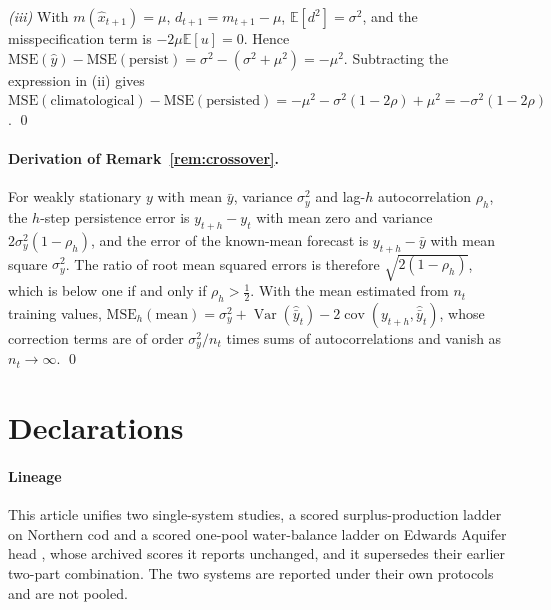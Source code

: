 \documentclass[preprint,11pt,authoryear]{elsarticle}
\theoremstyle{definition}
\theoremstyle{remark}
\newcommand{\MSE}{\mathrm{MSE}}
\newcommand{\pers}{\mathrm{persist}}
\newcommand{\E}{\mathbb{E}}
\begin{document}
\emph{(iii)} With $m(\hat x_{t+1})=\mu$, $d_{t+1}=m_{t+1}-\mu$, $\E[d^2]=\sigma^2$, and the misspecification term is $-2\mu\E[u]=0$. Hence $\MSE(\hat y)-\MSE(\pers) = \sigma^2-(\sigma^2+\mu^2) = -\mu^2$. Subtracting the expression in (ii) gives $\MSE(\text{climatological})-\MSE(\text{persisted}) = -\mu^2 - \sigma^2(1-2\rho)+\mu^2 = -\sigma^2(1-2\rho)$. \qed

\paragraph{Derivation of Remark~\ref{rem:crossover}.} For weakly stationary $y$ with mean $\bar y$, variance $\sigma_y^2$ and lag-$h$ autocorrelation $\rho_h$, the $h$-step persistence error is $y_{t+h}-y_t$ with mean zero and variance $2\sigma_y^2(1-\rho_h)$, and the error of the known-mean forecast is $y_{t+h}-\bar y$ with mean square $\sigma_y^2$. The ratio of root mean squared errors is therefore $\sqrt{2(1-\rho_h)}$, which is below one if and only if $\rho_h>\tfrac12$. With the mean estimated from $n_t$ training values, $\MSE_h(\mathrm{mean}) = \sigma_y^2 + \operatorname{Var}(\hat{\bar y}_t) - 2\operatorname{cov}(y_{t+h},\hat{\bar y}_t)$, whose correction terms are of order $\sigma_y^2/n_t$ times sums of autocorrelations and vanish as $n_t\to\infty$. \qed

\section*{Declarations}

\paragraph{Lineage} This article unifies two single-system studies, a scored surplus-production ladder on Northern cod \citep{Abaee2026cod} and a scored one-pool water-balance ladder on Edwards Aquifer head \citep{Abaee2026edwards}, whose archived scores it reports unchanged, and it supersedes their earlier two-part combination. The two systems are reported under their own protocols and are not pooled.
\end{document}
